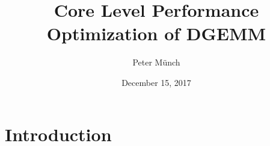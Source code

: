 \documentclass[11pt]{beamer}
\author{Peter M\"unch}
\title{Core Level Performance Optimization of DGEMM}
\date{December 15, 2017}
\begin{document}
\begin{frame}
\titlepage
\end{frame}


\newcommand{\linen}[2]{ &&\qquad #1 & #2 \\}
\newcommand{\linenn}[4]{#1 & #2 &\qquad #3 & #4 \\}
\newcommand{\linel}[1]{ &&#1 \\}

\usetikzlibrary{decorations.text}
\newcommand*{\mytextstylee}{\sffamily\bfseries\color{white!85}}
\newcommand*{\mytextstyle}{\sffamily\bfseries\color{black!85}}
\newcommand{\arcarrow}[3]{%
   \pgfmathsetmacro{\rin}{2.5}
   \pgfmathsetmacro{\rmid}{3.0}
   \pgfmathsetmacro{\rout}{3.5}
   \pgfmathsetmacro{\astart}{#1}
   \pgfmathsetmacro{\aend}{#2}
   \pgfmathsetmacro{\atip}{5}
   \fill[mygray, very thick] (\astart+\atip:\rin)
                         arc (\astart+\atip:\aend:\rin)
      -- (\aend-\atip:\rmid)
      -- (\aend:\rout)   arc (\aend:\astart+\atip:\rout)
      -- (\astart:\rmid) -- cycle;
   \path[
      decoration = {
         text along path,
         text = {|\mytextstyle|#3},
         text align = {align = center},
         raise = -1.0ex
      },
      decorate
   ](\astart+\atip:\rmid) arc (\astart+\atip:\aend+\atip:\rmid);
}
\newcommand{\arcarroww}[3]{%
   \pgfmathsetmacro{\rin}{2.5}
   \pgfmathsetmacro{\rmid}{3.0}
   \pgfmathsetmacro{\rout}{3.5}
   \pgfmathsetmacro{\astart}{#1}
   \pgfmathsetmacro{\aend}{#2}
   \pgfmathsetmacro{\atip}{5}
   \fill[blue, very thick] (\astart+\atip:\rin)
                         arc (\astart+\atip:\aend:\rin)
      -- (\aend-\atip:\rmid)
      -- (\aend:\rout)   arc (\aend:\astart+\atip:\rout)
      -- (\astart:\rmid) -- cycle;
   \path[
      decoration = {
         text along path,
         text = {|\mytextstylee|#3},
         text align = {align = center},
         raise = -1.0ex
      },
      decorate
   ](\astart+\atip:\rmid) arc (\astart+\atip:\aend+\atip:\rmid);
}


\section{Introduction}
\end{document}
